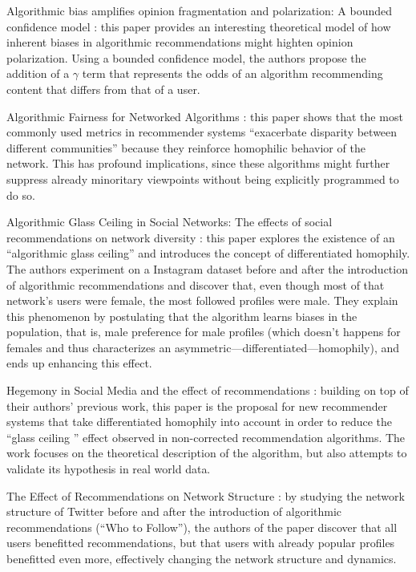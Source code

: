 Algorithmic bias amplifies opinion fragmentation and polarization: A bounded
confidence model \citet{sirbu_algorithmic_2019}: this paper provides an
interesting theoretical model of how inherent biases in algorithmic
recommendations might highten opinion polarization. Using a bounded confidence
model, the authors propose the addition of a $\gamma$ term that represents the
odds of an algorithm recommending content that differs from that of a user.

Algorithmic Fairness for Networked Algorithms \citet{stoica_algorithmic_2020}:
this paper shows that the most commonly used metrics in recommender systems
``exacerbate disparity between different communities'' because they reinforce
homophilic behavior of the network. This has profound implications, since these
algorithms might further suppress already minoritary viewpoints without being
explicitly programmed to do so.

Algorithmic Glass Ceiling in Social Networks: The effects of social
recommendations on network diversity \citet{stoica_algorithmic_2018}: this paper
explores the existence of an ``algorithmic glass ceiling'' and introduces the
concept of differentiated homophily. The authors experiment on a Instagram
dataset before and after the introduction of algorithmic recommendations and
discover that, even though most of that network's users were female, the most
followed profiles were male. They explain this phenomenon by postulating that
the algorithm learns biases in the population, that is, male preference for male
profiles (which doesn't happens for females and thus characterizes an
asymmetric---differentiated---homophily), and ends up enhancing this effect.

Hegemony in Social Media and the effect of recommendations
\citet{stoica_hegemony_2019}: building on top of their authors' previous work,
this paper is the proposal for new recommender systems that take differentiated
homophily into account in order to reduce the ``glass ceiling '' effect observed
in non-corrected recommendation algorithms. The work focuses on the theoretical
description of the algorithm, but also attempts to validate its hypothesis in
real world data.

The Effect of Recommendations on Network Structure \citet{su_effect_2016}: by
studying the network structure of Twitter before and after the introduction of
algorithmic recommendations (``Who to Follow''), the authors of the paper
discover that all users benefitted recommendations, but that users with already
popular profiles benefitted even more, effectively changing the network
structure and dynamics.

